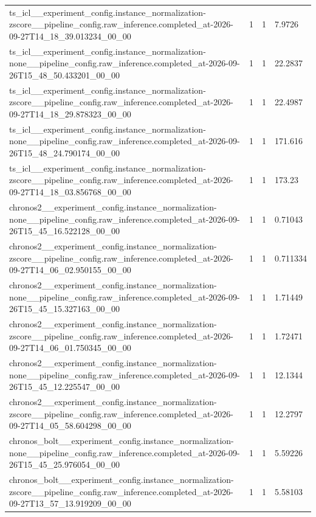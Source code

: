 \begin{tabular}{llll}
ts\_icl\_\_experiment\_config.instance\_normalization-zscore\_\_pipeline\_config.raw\_inference.completed\_at-2026-09-27T14\_18\_39.013234\_00\_00 & 1 & 1 & 7.9726 \\
ts\_icl\_\_experiment\_config.instance\_normalization-none\_\_pipeline\_config.raw\_inference.completed\_at-2026-09-26T15\_48\_50.433201\_00\_00 & 1 & 1 & 22.2837 \\
ts\_icl\_\_experiment\_config.instance\_normalization-zscore\_\_pipeline\_config.raw\_inference.completed\_at-2026-09-27T14\_18\_29.878323\_00\_00 & 1 & 1 & 22.4987 \\
ts\_icl\_\_experiment\_config.instance\_normalization-none\_\_pipeline\_config.raw\_inference.completed\_at-2026-09-26T15\_48\_24.790174\_00\_00 & 1 & 1 & 171.616 \\
ts\_icl\_\_experiment\_config.instance\_normalization-zscore\_\_pipeline\_config.raw\_inference.completed\_at-2026-09-27T14\_18\_03.856768\_00\_00 & 1 & 1 & 173.23 \\
chronos2\_\_experiment\_config.instance\_normalization-none\_\_pipeline\_config.raw\_inference.completed\_at-2026-09-26T15\_45\_16.522128\_00\_00 & 1 & 1 & 0.71043 \\
chronos2\_\_experiment\_config.instance\_normalization-zscore\_\_pipeline\_config.raw\_inference.completed\_at-2026-09-27T14\_06\_02.950155\_00\_00 & 1 & 1 & 0.711334 \\
chronos2\_\_experiment\_config.instance\_normalization-none\_\_pipeline\_config.raw\_inference.completed\_at-2026-09-26T15\_45\_15.327163\_00\_00 & 1 & 1 & 1.71449 \\
chronos2\_\_experiment\_config.instance\_normalization-zscore\_\_pipeline\_config.raw\_inference.completed\_at-2026-09-27T14\_06\_01.750345\_00\_00 & 1 & 1 & 1.72471 \\
chronos2\_\_experiment\_config.instance\_normalization-none\_\_pipeline\_config.raw\_inference.completed\_at-2026-09-26T15\_45\_12.225547\_00\_00 & 1 & 1 & 12.1344 \\
chronos2\_\_experiment\_config.instance\_normalization-zscore\_\_pipeline\_config.raw\_inference.completed\_at-2026-09-27T14\_05\_58.604298\_00\_00 & 1 & 1 & 12.2797 \\
chronos\_bolt\_\_experiment\_config.instance\_normalization-none\_\_pipeline\_config.raw\_inference.completed\_at-2026-09-26T15\_45\_25.976054\_00\_00 & 1 & 1 & 5.59226 \\
chronos\_bolt\_\_experiment\_config.instance\_normalization-zscore\_\_pipeline\_config.raw\_inference.completed\_at-2026-09-27T13\_57\_13.919209\_00\_00 & 1 & 1 & 5.58103 \\

\end{tabular}
